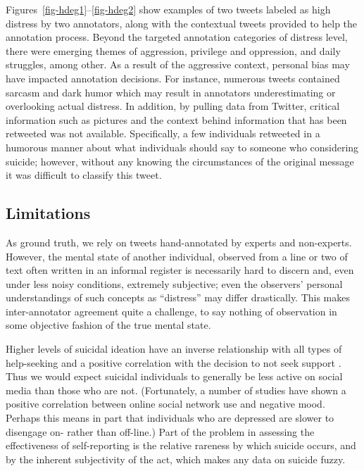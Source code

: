 \documentclass[11pt]{article}
\begin{document}
Figures~\ref{fig-hdeg1}--\ref{fig-hdeg2} show examples of two tweets labeled as high distress by two annotators, along with the contextual tweets provided to help the annotation process. 
Beyond the targeted annotation categories of distress level, there were emerging themes of aggression, privilege and oppression, and daily struggles, among other.  As a result of the aggressive context, personal bias may have impacted annotation decisions. For instance, numerous tweets contained sarcasm and dark humor which may result in annotators underestimating or overlooking actual distress. In addition, by pulling data from Twitter, critical information such as pictures and the context behind information that has been retweeted was not available.  Specifically, a few individuals retweeted in a humorous manner about what individuals should say to someone who considering suicide; however, without any knowing the circumstances of the original message it was difficult to classify this tweet.  %


\subsection{Limitations}
As ground truth, we rely on tweets hand-annotated by experts and non-experts. However, the mental state of another individual, observed from a line or two of text  often written in an informal register is necessarily hard to discern and, even under less noisy conditions, extremely subjective; even the observers' personal understandings of such concepts as ``distress'' may differ drastically. This makes inter-annotator agreement quite a challenge, to say nothing of observation in some objective fashion of the true mental state.


Higher levels of suicidal ideation have an inverse relationship with all types of help-seeking and a positive correlation with the decision to not seek support \cite{deane2001suicidal}. Thus we would expect suicidal individuals to generally be less active on social media than those who are not. (Fortunately, a number of studies have shown a positive correlation between online social network use and negative mood. Perhaps this means in part that individuals who are depressed are slower to disengage on- rather than off-line.)
 Part of the problem in assessing the effectiveness of self-reporting is the relative rareness by which suicide occurs, and by the inherent subjectivity of the act, which makes any data on suicide fuzzy.
\end{document}
